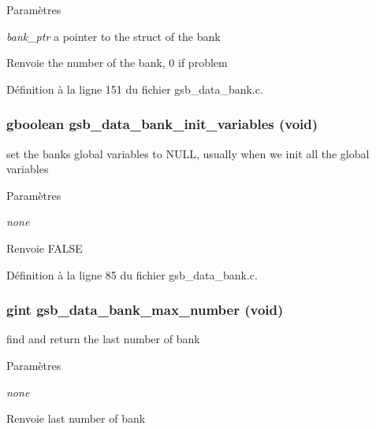 \begin{DoxyParams}{Paramètres}
\item[{\em bank\_\-ptr}]a pointer to the struct of the bank\end{DoxyParams}
\begin{DoxyReturn}{Renvoie}
the number of the bank, 0 if problem 
\end{DoxyReturn}


Définition à la ligne 151 du fichier gsb\_\-data\_\-bank.c.

\subsubsection[{gsb\_\-data\_\-bank\_\-init\_\-variables}]{\setlength{\rightskip}{0pt plus 5cm}gboolean gsb\_\-data\_\-bank\_\-init\_\-variables (void)}\label{gsb__data__bank_8h_ae5ffeaf39ec5866843d17f2f001e9eb9}
set the banks global variables to NULL, usually when we init all the global variables


\begin{DoxyParams}{Paramètres}
\item[{\em none}]\end{DoxyParams}
\begin{DoxyReturn}{Renvoie}
FALSE 
\end{DoxyReturn}


Définition à la ligne 85 du fichier gsb\_\-data\_\-bank.c.

\subsubsection[{gsb\_\-data\_\-bank\_\-max\_\-number}]{\setlength{\rightskip}{0pt plus 5cm}gint gsb\_\-data\_\-bank\_\-max\_\-number (void)}\label{gsb__data__bank_8h_a6c219326668f89af5254d7ab57af0448}
find and return the last number of bank


\begin{DoxyParams}{Paramètres}
\item[{\em none}]\end{DoxyParams}
\begin{DoxyReturn}{Renvoie}
last number of bank 
\end{DoxyReturn}


